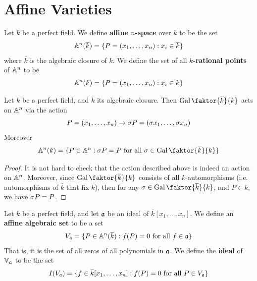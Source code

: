 \section{Affine Varieties}

\begin{definition}
    Let $k$ be a perfect field. We define  \textbf{affine $n$-space} over $k$ to
    be the set
    \begin{equation*}
        \mathbb{A}^n(\overline{k})=\{P=(x_1, \dots, x_n) : x_i \in \overline{k}\}
    \end{equation*}
    where $\bar{k}$ is the algebraic closure of $k$. We define the set of all
     \textbf{$k$-rational points} of $\mathbb{A}^n$ to be
     \begin{equation*}
        \mathbb{A}^n(k)=\{P=(x_1, \dots, x_n) : x_i \in k\}
     \end{equation*}
\end{definition}

\begin{lemma}\label{1.1.1}
    Let $k$ be a perfect field, and $\bar{k}$ its algebraic closure. Then
    $\Gal{\faktor{\bar{k}}{k}}$ acts on $\mathbb{A}^n$ via the action
    \begin{equation*}
        P=(x_1, \dots, x_n) \xrightarrow{} \sigma{P}=(\sigma{x_1}, \dots, \sigma{x_n})
    \end{equation*}
    Moreover
    \begin{equation*}
        \A^n(k)=\{P \in \A^n : \s{P}=P \text{ for all } \s \in
        \Gal{\faktor{\bar{k}}{k}}\}
    \end{equation*}
\end{lemma}
\begin{proof}
    It is not hard to check that the action described above is indeed an action
    on $\mathbb{A}^n$. Moreover, since $\Gal{\faktor{\bar{k}}{k}}$ consists of all
    $k$-automorphisms  (i.e. automorphisms of $\bar{k}$ that fix $k$), then for
    any $\s \in \Gal{\faktor{\bar{k}}{k}}$, and $P \in k$, we have  $\sigma{P}=P$.
\end{proof}

\begin{definition}
    Let $k$ be a perfect field, and let $\mathfrak{a}$ be an ideal of $\bar{k}[x_1,
    \dots, x_n]$. We define an \textbf{affine algebraic set} to be a set
    \begin{equation*}
        V_{\mathfrak{a}}=\{P \in \mathbb{A}^n(\overline{k}) : f(P)=0 \text{ for all } f \in \mathfrak{a}\}
    \end{equation*}
    That is, it is the set of all zeros of all polynomials in $\mathfrak{a}$. We define
    the  \textbf{ideal} of $\mathbb{V}_{\mathfrak{a}}$ to be the set
    \begin{equation*}
        I(V_{\mathfrak{a}})=\{f \in \overline{k}[x_1, \dots, x_n] : f(P)=0 \text{ for all } P
        \in V_{\mathfrak{a}}\}
    \end{equation*}
\end{definition}

